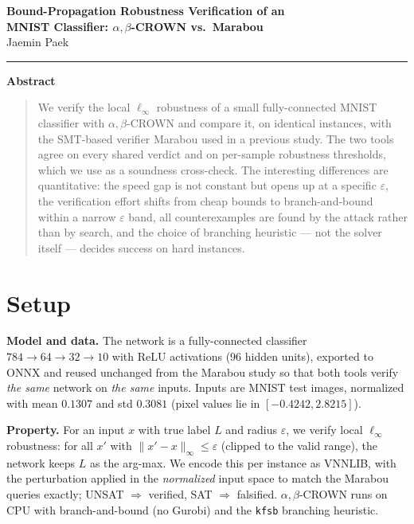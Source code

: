 \documentclass[10pt]{article}
\newcommand{\abc}{$\alpha,\beta$-CROWN}
\newcommand{\linf}{$\ell_\infty$}
\newcommand{\eps}{$\varepsilon$}
\begin{document}
\begin{center}
  {\LARGE\bfseries Bound-Propagation Robustness Verification of an\\[2pt]
   MNIST Classifier: $\alpha,\beta$-CROWN vs.\ Marabou}\\[10pt]
  {\normalsize Jaemin Paek}\\[2pt]
  \rule{\textwidth}{0.4pt}
\end{center}

\begin{center}\textbf{Abstract}\end{center}
\begin{quote}\small
We verify the local \linf{} robustness of a small fully-connected MNIST classifier with
\abc{} and compare it, on identical instances, with the SMT-based verifier Marabou used in
a previous study. The two tools agree on every shared verdict and on per-sample robustness
thresholds, which we use as a soundness cross-check. The interesting differences are
quantitative: the speed gap is not constant but opens up at a specific \eps{}, the
verification effort shifts from cheap bounds to branch-and-bound within a narrow \eps{} band,
all counterexamples are found by the attack rather than by search, and the choice of
branching heuristic --- not the solver itself --- decides success on hard instances.
\end{quote}

\section{Setup}
\textbf{Model and data.} The network is a fully-connected classifier $784\!\to\!64\!\to\!32
\!\to\!10$ with ReLU activations (96 hidden units), exported to ONNX and reused unchanged
from the Marabou study so that both tools verify \emph{the same} network on \emph{the same}
inputs. Inputs are MNIST test images, normalized with mean $0.1307$ and std $0.3081$ (pixel
values lie in $[-0.4242, 2.8215]$).

\textbf{Property.} For an input $x$ with true label $L$ and radius \eps{}, we verify local
\linf{} robustness: for all $x'$ with $\lVert x'-x\rVert_\infty \le \varepsilon$ (clipped to
the valid range), the network keeps $L$ as the arg-max. We encode this per instance as
VNNLIB, with the perturbation applied in the \emph{normalized} input space to match the
Marabou queries exactly; UNSAT $\Rightarrow$ verified, SAT $\Rightarrow$ falsified. \abc{}
runs on CPU with branch-and-bound (no Gurobi) and the \texttt{kfsb} branching heuristic.
\end{document}
